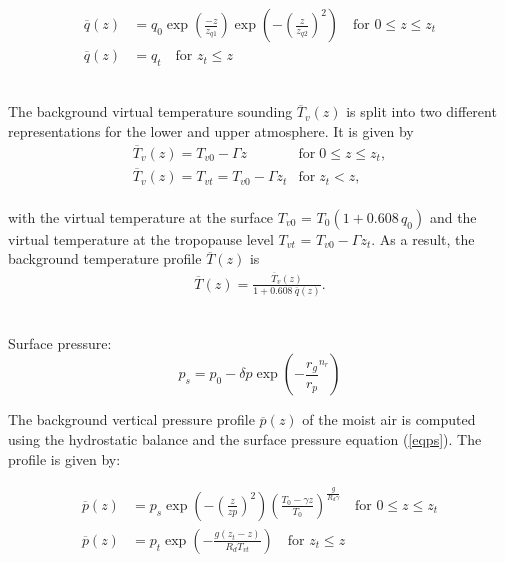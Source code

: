 \documentclass[times,doublespace]{fldauth}
\begin{document}
\begin{equation}
\begin{split}
\overline{q}(z)&=q_0 \exp\left(\frac{-z}{z_{q1}}\right)\exp\left(-\left(\frac{z}{z_{q2}}\right)^2\right) \text{ ~~for   } 0 \leq z \leq z_t \\
\overline{q}(z)&=q_t  \text{ ~~for   }  z_t \leq z
\end{split}
\end{equation}


~\\The background virtual temperature sounding $\overline{T}_v(z)$ is split into two different representations for the lower and upper atmosphere.  It is given by
\begin{equation}
\begin{array}{ll} \label{eq2}
\overline{T}_v(z) = T_{v0} - \Gamma z & \mbox{for} \; 0 \le z \le z_t, \\
\overline{T}_v(z) = T_{vt} = T_{v0} - \Gamma z_t & \mbox{for} \; z_t < z, 
\end{array}
\end{equation}
~\\with the virtual temperature at the surface $T_{v0}$ = $T_0 (1+0.608 \, q_0)$ and the virtual temperature at the tropopause level $T_{vt}$ = $T_{v0} - \Gamma z_t$.  As a result, the background temperature profile $\overline{T}(z)$ is
\begin{eqnarray} \label{eq3}
\overline{T}(z) = \frac{\overline{T}_v(z)}{1 + 0.608\ \overline{q}(z)}.
\end{eqnarray}


~\\ Surface pressure:
\begin{equation}
p_s=p_0-\delta p \exp\left(-\frac{r_g}{r_p}^{n_r}\right)
\label{eqps}
\end{equation}

The background vertical pressure profile $\overline{p}(z)$ of the moist air is computed using the hydrostatic balance and the surface pressure equation (\ref{eqps}). The profile is given by:


\begin{equation}
\begin{split}
\overline{p}(z)&=p_s \exp\left(-\left(\frac{z}{zp}\right)^{2}\right)\left(\frac{T_0-\gamma z}{T_0}\right)^{\frac{g}{R_d\gamma}} \text{ ~~for   } 0 \leq z \leq z_t \\
\overline{p}(z)&=p_t \exp\left(-\frac{g(z_t-z)}{R_dT_{vt}}\right) \text{ ~~for   }  z_t \leq z
\end{split}
\end{equation}
\end{document}
